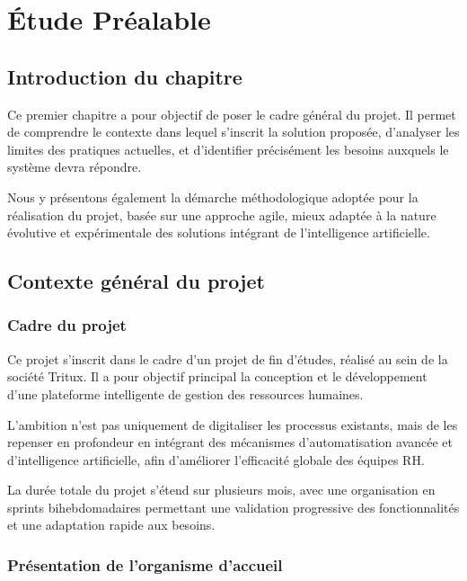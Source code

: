 \chapter{Étude Préalable}
\label{chap:etude-prealable}

\section*{Introduction du chapitre}

Ce premier chapitre a pour objectif de poser le cadre général du projet. Il permet de comprendre le contexte dans lequel s'inscrit la solution proposée, d'analyser les limites des pratiques actuelles, et d'identifier précisément les besoins auxquels le système devra répondre.

Nous y présentons également la démarche méthodologique adoptée pour la réalisation du projet, basée sur une approche agile, mieux adaptée à la nature évolutive et expérimentale des solutions intégrant de l'intelligence artificielle.


\section{Contexte général du projet}
\label{sec:contexte-general}

\subsection{Cadre du projet}

Ce projet s'inscrit dans le cadre d'un projet de fin d'études, réalisé au sein de la société Tritux. Il a pour objectif principal la conception et le développement d'une plateforme intelligente de gestion des ressources humaines.

L'ambition n'est pas uniquement de digitaliser les processus existants, mais de les repenser en profondeur en intégrant des mécanismes d'automatisation avancée et d'intelligence artificielle, afin d'améliorer l'efficacité globale des équipes RH.

La durée totale du projet s'étend sur plusieurs mois, avec une organisation en sprints bihebdomadaires permettant une validation progressive des fonctionnalités et une adaptation rapide aux besoins.


\subsection{Présentation de l'organisme d'accueil}


